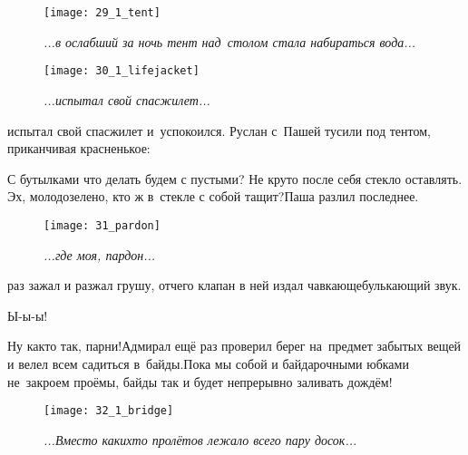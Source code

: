 \begin{figure}[h]
	\centering
	\texttt{[image: 29\_1\_tent]}
	\caption{\small\textit{...в ослабший за ночь тент над~столом стала набираться вода...}}
\end{figure}

\newpage

\begin{wrapfigure}[10]{r}{0.55\textwidth}
	\centering
	\texttt{[image: 30\_1\_lifejacket]}
	\caption{\small\textit{...испытал свой спасжилет...}}
\end{wrapfigure}испытал свой спасжилет и~успокоился. Руслан с~Пашей тусили под тентом, приканчивая красненькое:

\diagdash С бутылками что делать будем с пустыми? Не круто после себя стекло оставлять. Эх, молодо\sdash зелено, кто ж в~стекле с собой тащит?\mdash Паша разлил последнее.

\newpage

\begin{wrapfigure}[12]{l}{0.50\textwidth}
	\centering
	\texttt{[image: 31\_pardon]}
	\caption{\small\textit{...где моя, пардон...}}
\end{wrapfigure}раз зажал и разжал грушу, отчего клапан в ней издал чавкающе\sdash булькающий звук.

\diagdash Ы-ы-ы! 

\diagdash Ну как\sdash то так, парни!\mdash Адмирал ещё раз проверил берег на~предмет забытых вещей и велел всем садиться в~байды.\mdash Пока мы собой и байдарочными юбками не~закроем проёмы, байды так и будет непрерывно заливать дождём!

\newpage

\begin{figure}[h]
	\centering
	\texttt{[image: 32\_1\_bridge]}
	\caption{\small\textit{...Вместо каких\sdash то пролётов лежало всего пару досок...}}
\end{figure}

\newpage


